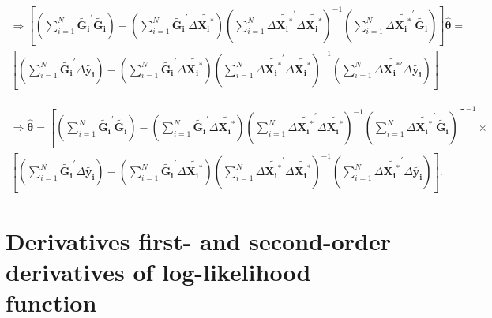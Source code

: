 \documentclass[12pt,a4paper,hyperref]{article}
\begin{document}
\begin{equation}
\begin{split}
\Rightarrow
[(\sum_{i=1}^{N} \tilde{\boldsymbol{G_{i}}}^{'} \tilde{\boldsymbol{G_{i}}})-(\sum_{i=1}^{N} \tilde{\boldsymbol{G_{i}}}^{'} \Delta \tilde{\boldsymbol{X_{i}}^{\ast}}) (\sum_{i=1}^{N} \Delta \tilde{\boldsymbol{X_{i}}^{\ast}}^{'} \Delta \tilde{\boldsymbol{X_{i}}^{\ast}})^{-1}(\sum_{i=1}^{N} \Delta \tilde{\boldsymbol{X_{i}}^{\ast}}^{'} \tilde{\boldsymbol{G_{i}}}) ]\hat{\boldsymbol{\theta}}= \\
[(\sum_{i=1}^{N} \tilde{\boldsymbol{G_{i}}}^{'} \Delta \tilde{\boldsymbol{y_{i}}})-(\sum_{i=1}^{N} \tilde{\boldsymbol{G_{i}}}^{'} \Delta \tilde{\boldsymbol{X_{i}}^{\ast}}) (\sum_{i=1}^{N} \Delta \tilde{\boldsymbol{X_{i}}^{\ast}}^{'} \Delta \tilde{\boldsymbol{X_{i}}^{\ast}})^{-1}(\sum_{i=1}^{N} \Delta \tilde{\boldsymbol{X_{i}}^{\ast '}} \Delta \tilde{\boldsymbol{y_{i}}})]
\end{split}
\end{equation}

\begin{equation}
\begin{split}
\Rightarrow
\hat{\boldsymbol{\theta}}=[(\sum_{i=1}^{N} \tilde{\boldsymbol{G_{i}}}^{'} \tilde{\boldsymbol{G_{i}}})-(\sum_{i=1}^{N} \tilde{\boldsymbol{G_{i}}}^{'} \Delta \tilde{\boldsymbol{X_{i}}^{\ast}}) (\sum_{i=1}^{N} \Delta \tilde{\boldsymbol{X_{i}}^{\ast}}^{'} \Delta \tilde{\boldsymbol{X_{i}}^{\ast}})^{-1}(\sum_{i=1}^{N} \Delta \tilde{\boldsymbol{X_{i}}^{\ast}}^{'} \tilde{\boldsymbol{G_{i}}}) ]^{-1} \times \\
[(\sum_{i=1}^{N} \tilde{\boldsymbol{G_{i}}}^{'} \Delta \tilde{\boldsymbol{y_{i}}})-(\sum_{i=1}^{N} \tilde{\boldsymbol{G_{i}}}^{'} \Delta \tilde{\boldsymbol{X_{i}}^{\ast}}) (\sum_{i=1}^{N} \Delta \tilde{\boldsymbol{X_{i}}^{\ast}}^{'} \Delta \tilde{\boldsymbol{X_{i}}^{\ast}})^{-1}(\sum_{i=1}^{N} \Delta \tilde{\boldsymbol{X_{i}}^{\ast }}^{'} \Delta \tilde{\boldsymbol{y_{i}}})].
\end{split}
\end{equation}






\section{Derivatives first- and second-order derivatives of log-likelihood function}
\end{document}
